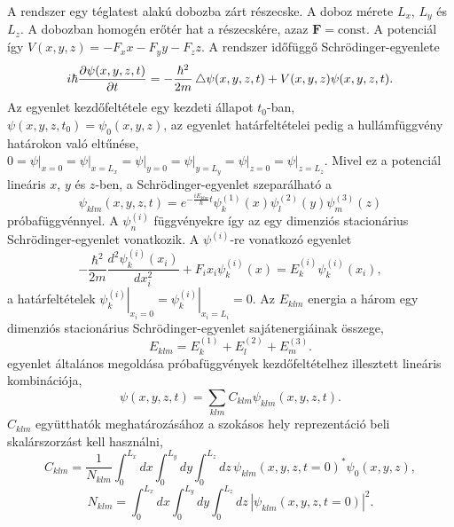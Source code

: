 A rendszer egy téglatest alakú dobozba zárt részecske. A doboz mérete $L_x$, $L_y$ és $L_z$. A dobozban homogén erőtér hat a részecskére, azaz $\boldsymbol{F} = \text{const}$. A potenciál így $V(x, y, z) = -F_xx-F_yy-F_zz$. A rendszer időfüggő Schrödinger-egyenlete
\begin{equation}
	i\hbar\frac{\partial \psi(x, y, z, t)}{\partial t} = -\frac{\hbar^2}{2m} \mathop{}\!\mathbin\bigtriangleup \psi(x, y, z, t) + V(x, y, z)\psi(x, y, z, t).
	\label{3dbox:3dscheq}
\end{equation}
Az egyenlet kezdőfeltétele egy kezdeti állapot $t_0$-ban, $\psi(x, y, z, t_0) = \psi_0(x, y, z)$, az egyenlet határfeltételei pedig a hullámfüggvény határokon való eltűnése, $0=\left.\psi\right|_{x=0}=\left.\psi\right|_{x=L_x}=\left.\psi\right|_{y=0}=\left.\psi\right|_{y=L_y}=\left.\psi\right|_{z=0}=\left.\psi\right|_{z=L_z}$. Mivel ez a potenciál lineáris $x$, $y$ és $z$-ben, a Schrödinger-egyenlet szeparálható a
\begin{equation}
	\psi_{klm}(x, y, z, t) = e^{-\frac{iE_{klm}}{\hbar}t}\psi^{(1)}_k(x)\psi^{(2)}_l(y)\psi^{(3)}_m(z)
	\label{3dox:3dansatz}
\end{equation}
próbafüggvénnyel. A $\psi^{(i)}_n$ függvényekre így az egy dimenziós stacionárius Schrödinger-egyenlet vonatkozik. A $\psi^{(i)}$-re vonatkozó egyenlet 
\begin{equation}
	-\frac{\hbar^2}{2m}\frac{d^2\psi^{(i)}_k(x_i)}{dx_i^2} + F_ix_i\psi^{(i)}_k(x) = E^{(i)}_k\psi^{(i)}_k(x_i),
	\label{3dbox:1deq}
\end{equation}
a határfeltételek $\left.\psi^{(i)}_k\right|_{x_i=0}=\left.\psi^{(i)}_k\right|_{x_i=L_i}=0$. Az $E_{klm}$ energia a három egy dimenziós stacionárius Schrödinger-egyenlet sajátenergiáinak összege,
\begin{equation}
	E_{klm} = E^{(1)}_k+E^{(2)}_l+E^{(3)}_m.
\end{equation}
 egyenlet általános megoldása  próbafüggvények kezdőfeltételhez illesztett lineáris kombinációja,
\begin{equation}
	\psi(x,y,z,t) = \sum_{klm}C_{klm}\psi_{klm}(x,y,z,t).
\end{equation}
$C_{klm}$ együtthatók meghatározásához a szokásos hely reprezentáció beli skalárszorzást kell használni,
\begin{equation}
	C_{klm} = \frac{1}{N_{klm}}\int_0^{L_x}dx\int_0^{L_y}dy\int_0^{L_z}dz\,\psi_{klm}(x, y, z, t=0)^*\psi_0(x, y, z),
	\label{3dbox:ceq}
\end{equation}
\begin{equation}
	N_{klm} = \int_0^{L_x}dx\int_0^{L_y}dy\int_0^{L_z}dz\,|\psi_{klm}(x,y,z,t=0)|^2.
	\label{3dbox:3norm}
\end{equation}

